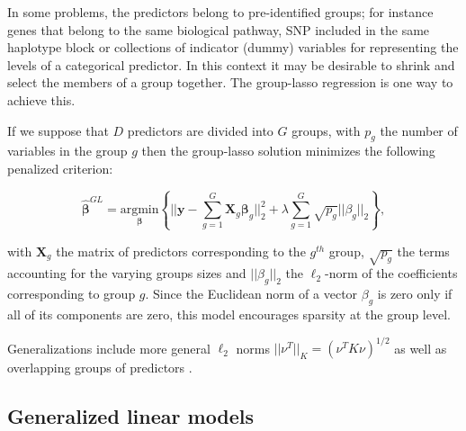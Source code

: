 \documentclass[]{book}
\begin{document}
In some problems, the predictors belong to pre-identified groups; for
instance genes that belong to the same biological pathway, SNP included
in the same haplotype block or collections of indicator (dummy)
variables for representing the levels of a categorical predictor. In
this context it may be desirable to shrink and select the members of a
group together. The group-lasso regression \citep{yuan_model_2006} is one way
to achieve this.

If we suppose that \(D\) predictors are divided into \(G\) groups, with
\(p_g\) the number of variables in the group \(g\) then the group-lasso
solution minimizes the following penalized criterion:

\[\hat{\boldsymbol{\beta}}^{GL} = \underset{\boldsymbol{\beta}}{\text{argmin}} \left\lbrace || \mathbf{y} - \sum_{g=1}^G \mathbf{X}_g\boldsymbol{\beta}_g ||_2^2 + \lambda \sum_{g=1}^G \sqrt{p_g}||\beta_g||_2 \right\rbrace, 
\label{eq:group-lasso}\]

with \(\mathbf{X}_g\) the matrix of predictors corresponding to the \(g^{th}\)
group, \(\sqrt{p_g}\) the terms accounting for the varying groups sizes
and \(||\beta_g||_2\) the \(\ell_2\)-norm of the coefficients corresponding
to group \(g\). Since the Euclidean norm of a vector \(\beta_g\) is zero
only if all of its components are zero, this model encourages sparsity
at the group level.

Generalizations include more general \(\ell_2\) norms
\(||\nu^T||_K = (\nu^TK\nu)^{1/2}\) as well as overlapping groups of
predictors \citep{jacob2009group, jenatton2011structured}.

\hypertarget{glm}{%
\subsection{Generalized linear models}\label{glm}}
\end{document}
